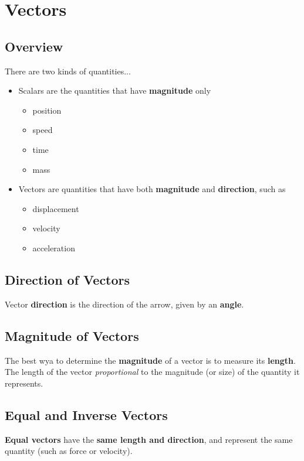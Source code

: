 \section{Vectors}
	
\subsection{Overview}
There are two kinds of quantities...
\begin{itemize}
	\item Scalars are the quantities that have \textbf{magnitude} only
	\begin{itemize}
		\item position
		\item speed
		\item time
		\item mass
	\end{itemize}
	
	\item Vectors are quantities that have both \textbf{magnitude} and \textbf{direction}, such as
	\begin{itemize}
		\item displacement
		\item velocity
		\item acceleration
	\end{itemize}
\end{itemize}
	
\subsection{Direction of Vectors}
Vector \textbf{direction} is the direction of the arrow, given by an \textbf{angle}.
	
\subsection{Magnitude of Vectors}
The best wya to determine the \textbf{magnitude} of a vector is to measure its \textbf{length}. The length of the vector \textit{proportional} to the magnitude (or size) of the quantity it represents.
	
\subsection{Equal and Inverse Vectors}
\textbf{Equal vectors} have the \textbf{same length and direction}, and represent the same quantity (such as force or velocity).
	
